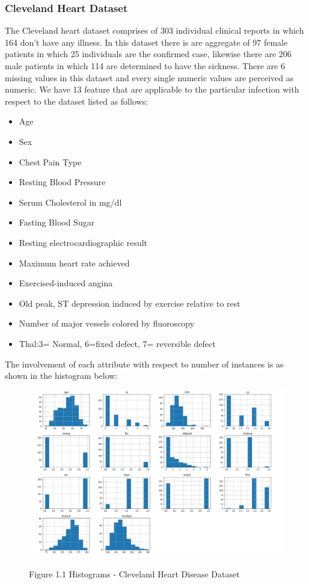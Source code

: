 \documentclass[oneside,12pt]{Classes/VTU}
\begin{document}
    \subsubsection{Cleveland Heart Dataset}
    The Cleveland heart dataset comprises of 303 individual clinical reports in which 164 don't have any illness. In this dataset there is are aggregate of 97 female patients in which 25 individuals are the confirmed case, likewise there are 206 male patients in which 114 are determined to have the sickness. There are 6 missing values in this dataset and every single numeric values are perceived as numeric. 
    We have 13 feature that are applicable to the particular infection with respect to the dataset listed as follows:
    \begin{itemize}
    	\item Age
    	\item Sex
    	\item Chest Pain Type
    	\item Resting Blood Pressure 
    	\item Serum Cholesterol in mg/dl 
    	\item Fasting Blood Sugar
    	\item Resting electrocardiographic result
    	\item Maximum heart rate achieved 
    	\item Exercised-induced angina
    	\item Old peak, ST depression induced by exercise relative to rest 
    	\item Number of major vessels colored by fluoroscopy 
    	\item Thal:3= Normal, 6=fixed defect, 7= reversible defect
    \end{itemize}
    The involvement of each attribute with respect to number of instances is as shown in the histogram below:
    
    \begin{figure}
    			\begin{center}
    				\includegraphics[scale=0.4]{images/hearthistogram.png}
    			\end{center}
	    		\begin{center}
	    			Figure 1.1 Histograms - Cleveland Heart Disease Dataset
	    		\end{center}
    \end{figure}
	
\end{document}
